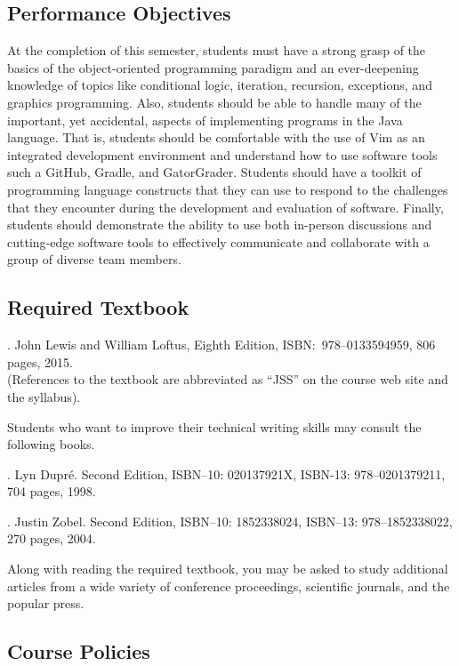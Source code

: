 \documentclass[11pt]{article}
\begin{document}
\subsection*{Performance Objectives}

At the completion of this semester, students must have a strong grasp of the basics of the object-oriented programming
paradigm and an ever-deepening knowledge of topics like conditional logic, iteration, recursion, exceptions, and
graphics programming. Also, students should be able to handle many of the important, yet accidental, aspects of
implementing programs in the Java language. That is, students should be comfortable with the use of Vim as an integrated
development environment and understand how to use software tools such a GitHub, Gradle, and GatorGrader. Students should
have a toolkit of programming language constructs that they can use to respond to the challenges that they encounter
during the development and evaluation of software. Finally, students should demonstrate the ability to use both
in-person discussions and cutting-edge software tools to effectively communicate and collaborate with a group of diverse
team members.

\subsection*{Required Textbook}

. John Lewis and William Loftus,
Eighth Edition, ISBN:\ 978--0133594959, 806 pages, 2015. \\
(References to the textbook are abbreviated as ``JSS'' on the course web site and the syllabus).

\noindent
Students who want to improve their technical writing skills may consult the following books.

. Lyn Dupr\'e. Second Edition,  ISBN--10: 020137921X,
ISBN-13: 978--0201379211, 704 pages, 1998.

. Justin Zobel. Second Edition,  ISBN--10: 1852338024, ISBN--13:
978--1852338022, 270 pages, 2004.

\noindent Along with reading the required textbook, you may be asked to study additional articles from a wide variety of
conference proceedings, scientific journals, and the popular press.

\subsection*{Course Policies}
\end{document}
